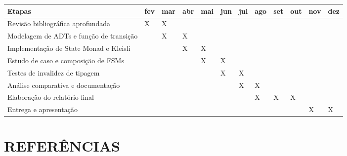 \documentclass[12pt,a4paper]{article}
\begin{document}
\begin{table}[h]
\centering
\small
\begin{tabular}{|p{4.0cm}|p{0.6cm}|p{0.6cm}|p{0.6cm}|p{0.6cm}|p{0.6cm}|p{0.6cm}|p{0.6cm}|p{0.6cm}|p{0.6cm}|p{0.6cm}|p{0.6cm}|}
\hline
\textbf{Etapas} & \textbf{fev} & \textbf{mar} & \textbf{abr} & \textbf{mai} & \textbf{jun} & \textbf{jul} & \textbf{ago} & \textbf{set} & \textbf{out} & \textbf{nov} & \textbf{dez} \\
\hline
Revisão bibliográfica aprofundada & X & X & & & & & & & & & \\
\hline
Modelagem de ADTs e função de transição & & X & X & & & & & & & & \\
\hline
Implementação de State Monad e Kleisli & & & X & X & & & & & & & \\
\hline
Estudo de caso e composição de FSMs & & & & X & X & & & & & & \\
\hline
Testes de invalidez de tipagem & & & & & X & X & & & & & \\
\hline
Análise comparativa e documentação & & & & & & X & X & & & & \\
\hline
Elaboração do relatório final & & & & & & & X & X & X & & \\
\hline
Entrega e apresentação & & & & & & & & & & X & X \\
\hline
\end{tabular}
\end{table}

\newpage
\section{REFERÊNCIAS}
\end{document}
